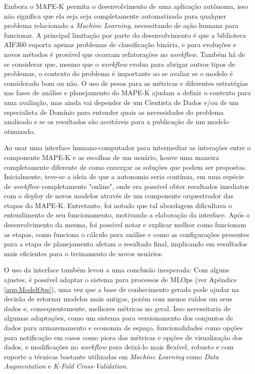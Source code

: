 \documentclass[portugues]{ic-tese}
\begin{document}
Embora o MAPE-K permita o desenvolvimento de uma aplicação autônoma, isso não significa que ela seja seja completamente automatizada para qualquer problema relacionado a \textit{Machine Learning}, necessitando de ação humana para funcionar. A principal limitação por parte do desenvolvimento é que a biblioteca AIF360 suporta apenas problemas de classificação binária, e para evoluções e novos métodos é provável que ocorram refatorações no \textit{workflow}. Também há de se considerar que, mesmo que o \textit{workflow} evolua para abrigar outros tipos de problemas, o contexto do problema é importante ao se avaliar se o modelo é considerado bom ou não. O uso de pesos para as métricas e diferentes estratégias nas fases de análise e planejamento do MAPE-K ajudam a definir o contexto para uma avaliação, mas ainda vai depender de um Cientista de Dados e/ou de um especialista de Domínio para entender quais as necessidades do problema analisado e se os resultados são aceitáveis para a publicação de um modelo otimizado.

Ao usar uma interface humano-computador para intermediar as interações entre o componente MAPE-K e as escolhas de um usuário, houve uma maneira completamente diferente de como enxergar as soluções que podem ser propostas. Inicialmente, teve-se a ideia de que a autonomia seria contínua, em uma espécie de \textit{workflow} completamente "online", onde era possivel obter resultados imediatos com o deploy de novos modelos através de um componente orquestrador das etapas do MAPE-K. Entretanto, foi notado que tal abordagem dificultava o entendimento de seu funcionamento, motivando a elaboração da interface. Após o desenvolvimento da mesma, foi possível notar e explicar melhor como funcionam as etapas, como funciona o cálculo para análise e como as configurações presentes para a etapa de planejamento afetam o resultado final, implicando em resultados mais eficientes para o treinamento de novos usuários.

O uso da interface também levou a uma conclusão inesperada: Com alguns ajustes, é possível adaptar o sistema para processos de MLOps (ver Apêndice \ref{app:ModelOps}), uma vez que a base de conhecimento gerada pode ajudar na decisão de retornar modelos mais antigos, porém com menos ruídos em seus dados e, consequentemente, melhores métricas no geral. Isso necessitaria de algumas adaptações, como um sistema para versionamento dos conjuntos de dados para armazenamento e economia de espaço, funcionalidades como opções para notificação em casos como piora das métricas e opções de visualização dos dados, e modificações no \textit{workflow} para deixá-lo mais flexível, robusto e com suporte a técnicas bastante utilizadas em \textit{Machine Learning} como \textit{Data Augmentation} e \textit{K-Fold Cross-Validation}.
\end{document}
